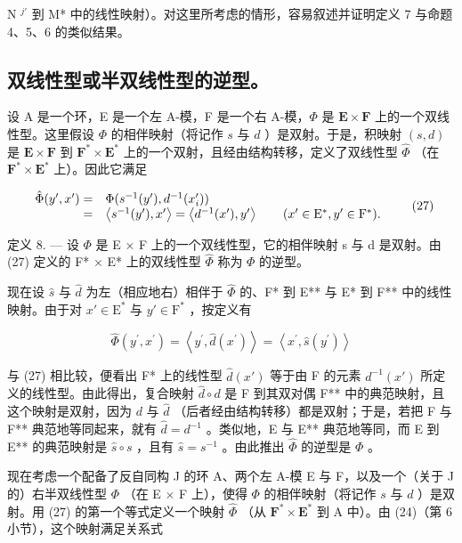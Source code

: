 N \(^{j'}\) 到 M* 中的线性映射）。对这里所考虑的情形，容易叙述并证明定义 7 与命题 4、5、6 的类似结果。

\subsection{双线性型或半双线性型的逆型。}

设 A 是一个环，E 是一个左 A-模，F 是一个右 A-模，\(\Phi\) 是 \(\mathbf{E} \times \mathbf{F}\) 上的一个双线性型。这里假设 \(\Phi\) 的相伴映射（将记作 \(s\) 与 \(d\) ）是双射。于是，积映射 \((s, d)\) 是 \(\mathbf{E} \times \mathbf{F}\) 到 \(\mathbf{F}^* \times \mathbf{E}^*\) 上的一个双射，且经由结构转移，定义了双线性型 \(\hat{\Phi}\) （在 \(\mathbf{F}^* \times \mathbf{E}^*\) 上）。因此它满足

\[
\begin{array}{r l} \hat {\Phi} (y ^ {\prime}, x ^ {\prime}) = & \Phi (s ^ {- 1} (y ^ {\prime}), d ^ {- 1} (x _ {i} ^ {\prime})) \\ = & \left\langle s ^ {- 1} (y ^ {\prime}), x ^ {\prime} \right\rangle = \left\langle d ^ {- 1} (x ^ {\prime}), y ^ {\prime} \right\rangle \qquad (x ^ {\prime} \in \mathrm{E} ^ {*}, y ^ {\prime} \in \mathrm{F} ^ {*}). \end{array}\tag{27}
\]

定义 8. --- 设 \(\Phi\) 是 E × F 上的一个双线性型，它的相伴映射 s 与 d 是双射。由 (27) 定义的 F* × E* 上的双线性型 \(\hat{\Phi}\) 称为 \(\Phi\) 的逆型。

现在设 \(\hat{s}\) 与 \(\hat{d}\) 为左（相应地右）相伴于 \(\hat{\Phi}\) 的、F* 到 E** 与 E* 到 F** 中的线性映射。由于对 \(x' \in \mathrm{E}^*\) 与 \(y' \in \mathrm{F}^*\) ，按定义有

\[
\hat {\Phi} (y ^ {\prime}, x ^ {\prime}) = \left\langle y ^ {\prime}, \hat {d} (x ^ {\prime}) \right\rangle = \left\langle x ^ {\prime}, \hat {s} (y ^ {\prime}) \right\rangle
\]

与 (27) 相比较，便看出 F* 上的线性型 \(\hat{d}(x')\) 等于由 F 的元素 \(d^{-1}(x')\) 所定义的线性型。由此得出，复合映射 \(\hat{d} \circ d\) 是 F 到其双对偶 F** 中的典范映射，且这个映射是双射，因为 \(d\) 与 \(\hat{d}\) （后者经由结构转移）都是双射；于是，若把 F 与 F** 典范地等同起来，就有 \(\hat{d} = d^{-1}\) 。类似地，E 与 E** 典范地等同，而 E 到 E** 的典范映射是 \(\hat{s} \circ s\) ，且有 \(\hat{s} = s^{-1}\) 。由此推出 \(\hat{\Phi}\) 的逆型是 \(\Phi\) 。

现在考虑一个配备了反自同构 J 的环 A、两个左 A-模 E 与 F，以及一个（关于 J 的）右半双线性型 \(\Phi\) （在 E \(\times\) F 上），使得 \(\Phi\) 的相伴映射（将记作 \(s\) 与 \(d\) ）是双射。用 (27) 的第一个等式定义一个映射 \(\hat{\Phi}\) （从 \(\mathbf{F}^{*} \times \mathbf{E}^{*}\) 到 A 中）。由 (24)（第 6 小节），这个映射满足关系式


